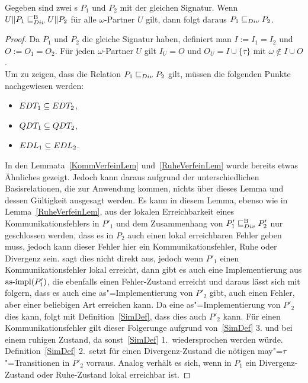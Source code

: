 \begin{Lem}
  \label{DivVerfeinLem}
  Gegeben sind zwei \MEIO{}s $P_1$ und $P_2$ mit der gleichen Signatur. Wenn
  $U\|P_1 \sqsubseteq  _{Div}^\mathrm{B} U\|P_2$ für alle $\omega$-Partner $U$ gilt, dann folgt daraus
  $P_1 \sqsubseteq  _{Div} P_2$.
\end{Lem}
\begin{proof}
  Da $P_1$ und $P_2$ die gleiche Signatur haben, definiert man $I:=I_1=I_2$ und
  $O:=O_1=O_2$. Für jeden $\omega$-Partner $U$ gilt $I_U=O$ und
  $O_U=I\cup\{\tau\}$ mit $\omega\notin I\cup O$.\\
  Um zu zeigen, dass die Relation $P_1 \sqsubseteq  _{Div} P_2$ gilt, müssen die folgenden
  Punkte nachgewiesen werden:
  \begin{itemize}
    \item $EDT _1\subseteq EDT _2$,
    \item $QDT _1\subseteq QDT _2$,
    \item $EDL _1\subseteq EDL _2$.
  \end{itemize}
  In den Lemmata~\ref{KommVerfeinLem} und~\ref{RuheVerfeinLem} wurde bereits
  etwas Ähnliches gezeigt. Jedoch kann daraus aufgrund der unterschiedlichen
  Basisrelationen, die zur Anwendung kommen, nichts über dieses Lemma und
  dessen Gültigkeit ausgesagt werden. Es kann in diesem Lemma, ebenso wie in
  Lemma~\ref{RuheVerfeinLem}, aus der lokalen Erreichbarkeit eines
  Kommunikationsfehlers in $P'_1$ und dem Zusammenhang von $P'_1 \sqsubseteq  _{Div}^\mathrm{B} P'_2$
  nur geschlossen werden, dass es in $P_2$ auch einen lokal erreichbaren
  Fehler geben muss, jedoch kann dieser Fehler hier ein Kommunikationsfehler,
  Ruhe oder Divergenz sein. \DBRel{} sagt dies nicht direkt aus, jedoch wenn
  $P'_1$ einen Kommunikationsfehler lokal erreicht, dann gibt es auch eine
  Implementierung aus $\mathrm{as}\text{-}\mathrm{impl} (P'_1)$, die ebenfalls einen Fehler-Zustand
  erreicht und daraus lässt sich mit \DBRel{} folgern, dass es auch eine
  as"=Implementierung von $P'_2$ gibt, auch einen Fehler, aber einer beliebigen
  Art erreichen kann. Da eine as"=Implementierung von $P'_2$ dies kann, folgt
  mit Definition~\ref{SimDef}, dass dies auch $P'_2$ kann. Für einen
  Kommunikationsfehler gilt dieser Folgerunge aufgrund von~\ref{SimDef} 3. und
  bei einem ruhigen Zustand, da sonst~\ref{SimDef} 1.\ wiedersprochen werden
  würde. Definition~\ref{SimDef} 2.\ setzt für einen Divergenz-Zustand die
  nötigen may"=$\tau$"=Transitionen in $P'_2$ vorraus. Analog verhält es sich,
  wenn in $P_1$ ein Divergenz-Zustand oder Ruhe-Zustand lokal erreichbar ist.


\end{proof}
